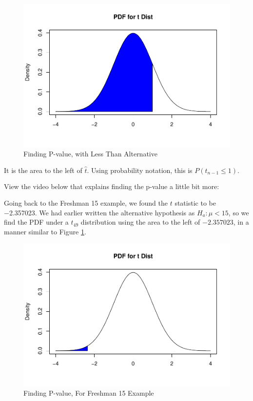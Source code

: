 \documentclass[
]{book}
\begin{document}
\begin{figure}
\centering
\includegraphics{bookdown-demo_files/figure-latex/9-pvalless-1.pdf}
\caption{\label{fig:9-pvalless}Finding P-value, with Less Than Alternative}
\end{figure}

It is the area to the left of \(\hat{t}\). Using probability notation, this is \(P( t_{n-1} \leq 1)\).

View the video below that explains finding the p-value a little bit more:

Going back to the Freshman 15 example, we found the \(t\) statistic to be −2.357023. We had earlier written the alternative hypothesis as \(H_a: \mu < 15\), so we find the PDF under a \(t_{49}\) distribution using the area to the left of \(-2.357023\), in a manner similar to Figure \ref{fig:9-pvalless}.

\begin{figure}
\centering
\includegraphics{bookdown-demo_files/figure-latex/9-pvaleg-1.pdf}
\caption{\label{fig:9-pvaleg}Finding P-value, For Freshman 15 Example}
\end{figure}
\end{document}
